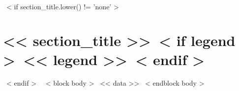 ~< if section_title.lower() != 'none' >~
\section{<< section_title >>~< if legend >~\hfill{\normalsize\normalfont<< legend >>}~< endif >~}
~< endif >~
  ~< block body >~
    << data >>
  ~< endblock body >~
